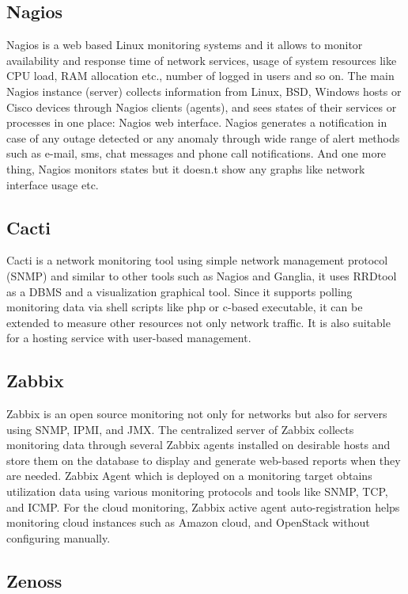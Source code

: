 \documentclass{sig-alternate}
\begin{document}
\subsection{Nagios}

Nagios is a web based Linux monitoring systems and it allows to monitor availability and response time of network services, usage of system resources like CPU load, RAM allocation etc., number of logged in users and so on. The main Nagios instance (server) collects information from Linux, BSD, Windows hosts or Cisco devices through Nagios clients (agents), and sees states of their services or processes in one place: Nagios web interface. Nagios generates a notification in case of any outage detected or any anomaly through wide range of alert methods such as e-mail, sms, chat messages and phone call notifications. And one more thing, Nagios monitors states but it doesn.t show any graphs like network interface usage etc.

\subsection{Cacti}
Cacti is a network monitoring tool using simple network management protocol (SNMP) and similar to other tools such as Nagios and Ganglia, it uses RRDtool as a DBMS and a visualization graphical tool. Since it supports polling monitoring data via shell scripts like php or c-based executable, it can be extended to measure other resources not only network traffic. It is also suitable for a hosting service with user-based management.

\subsection{Zabbix}

Zabbix is an open source monitoring not only for networks but also for servers using SNMP, IPMI, and JMX. The centralized server of Zabbix collects monitoring data through several Zabbix agents installed on desirable hosts and store them on the database to display and generate web-based reports when they are needed. Zabbix Agent which is deployed on a monitoring target obtains utilization data using various monitoring protocols and tools like SNMP, TCP, and ICMP. For the cloud monitoring, Zabbix active agent auto-registration helps monitoring cloud instances such as Amazon cloud, and OpenStack without configuring manually.

\subsection{Zenoss}
\end{document}
